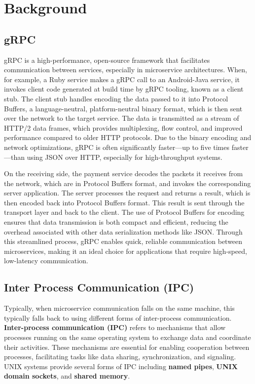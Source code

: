 \documentclass[letterpaper,twocolumn,10pt]{article}
\begin{document}
\section{Background}

\subsection{gRPC}
gRPC is a high-performance, open-source framework that facilitates communication between services, especially in microservice architectures.
When, for example, a Ruby service makes a gRPC call to an Android-Java service, it invokes client code generated at build time by gRPC tooling, known as a client stub.
The client stub handles encoding the data passed to it into Protocol Buffers, a language-neutral, platform-neutral binary format, which is then sent over the network to the target service.
The data is transmitted as a stream of HTTP/2 data frames, which provides multiplexing, flow control, and improved performance compared to older HTTP protocols.
Due to the binary encoding and network optimizations, gRPC is often significantly faster—up to five times faster—than using JSON over HTTP, especially for high-throughput systems.

On the receiving side, the payment service decodes the packets it receives from the network, which are in Protocol Buffers format, and invokes the corresponding server application.
The server processes the request and returns a result, which is then encoded back into Protocol Buffers format.
This result is sent through the transport layer and back to the client.
The use of Protocol Buffers for encoding ensures that data transmission is both compact and efficient, reducing the overhead associated with other data serialization methods like JSON.
Through this streamlined process, gRPC enables quick, reliable communication between microservices, making it an ideal choice for applications that require high-speed, low-latency communication.

\subsection{Inter Process Communication (IPC)}
Typically, when microservice communication falls on the same machine, this typically falls back to using different forms of inter-process communication.
\textbf{Inter-process communication (IPC)} refers to mechanisms that allow processes running on the same operating system to exchange data and coordinate their activities.
These mechanisms are essential for enabling cooperation between processes, facilitating tasks like data sharing, synchronization, and signaling.
UNIX systems provide several forms of IPC including \textbf{named pipes}, \textbf{UNIX domain sockets}, and \textbf{shared memory}.
\end{document}
